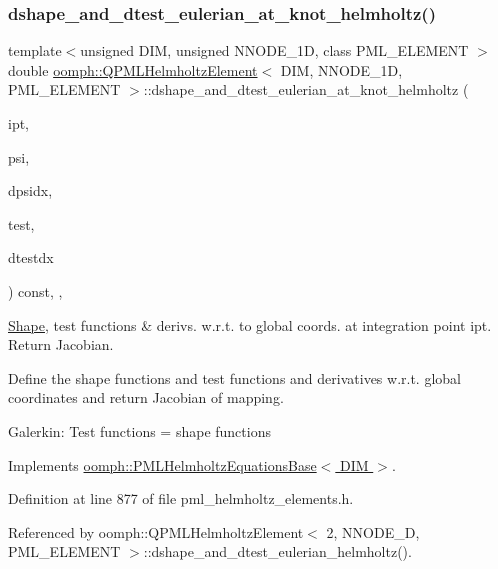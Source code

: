 \subsubsection{\texorpdfstring{dshape\+\_\+and\+\_\+dtest\+\_\+eulerian\+\_\+at\+\_\+knot\+\_\+helmholtz()}{dshape\_and\_dtest\_eulerian\_at\_knot\_helmholtz()}}
{\footnotesize\ttfamily template$<$unsigned D\+IM, unsigned N\+N\+O\+D\+E\+\_\+1D, class P\+M\+L\+\_\+\+E\+L\+E\+M\+E\+NT $>$ \\
double \hyperlink{classoomph_1_1QPMLHelmholtzElement}{oomph\+::\+Q\+P\+M\+L\+Helmholtz\+Element}$<$ D\+IM, N\+N\+O\+D\+E\+\_\+1D, P\+M\+L\+\_\+\+E\+L\+E\+M\+E\+NT $>$\+::dshape\+\_\+and\+\_\+dtest\+\_\+eulerian\+\_\+at\+\_\+knot\+\_\+helmholtz (\begin{DoxyParamCaption}\item[{const unsigned \&}]{ipt,  }\item[{\hyperlink{classoomph_1_1Shape}{Shape} \&}]{psi,  }\item[{\hyperlink{classoomph_1_1DShape}{D\+Shape} \&}]{dpsidx,  }\item[{\hyperlink{classoomph_1_1Shape}{Shape} \&}]{test,  }\item[{\hyperlink{classoomph_1_1DShape}{D\+Shape} \&}]{dtestdx }\end{DoxyParamCaption}) const\hspace{0.3cm}{\ttfamily [inline]}, {\ttfamily [protected]}, {\ttfamily [virtual]}}



\hyperlink{classoomph_1_1Shape}{Shape}, test functions \& derivs. w.\+r.\+t. to global coords. at integration point ipt. Return Jacobian. 

Define the shape functions and test functions and derivatives w.\+r.\+t. global coordinates and return Jacobian of mapping.

Galerkin\+: Test functions = shape functions 

Implements \hyperlink{classoomph_1_1PMLHelmholtzEquationsBase_aa283cd2415e7b9f9f3f7a71188403c8a}{oomph\+::\+P\+M\+L\+Helmholtz\+Equations\+Base$<$ D\+I\+M $>$}.



Definition at line 877 of file pml\+\_\+helmholtz\+\_\+elements.\+h.



Referenced by oomph\+::\+Q\+P\+M\+L\+Helmholtz\+Element$<$ 2, N\+N\+O\+D\+E\+\_\+D, P\+M\+L\+\_\+\+E\+L\+E\+M\+E\+N\+T $>$\+::dshape\+\_\+and\+\_\+dtest\+\_\+eulerian\+\_\+helmholtz().

